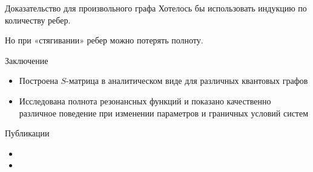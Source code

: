 \documentclass{beamer}
\begin{document}
\begin{frame}{Доказательство для произвольного графа}
Хотелось бы использовать индукцию по количеству ребер.

Но при «стягивании» ребер можно потерять полноту. %
\end{frame}


\begin{frame}{Заключение}
\begin{itemize}
\item Построена $S$-матрица в аналитическом виде для различных квантовых графов
\item Исследована полнота резонансных функций и показано качественно различное поведение при изменении параметров и граничных условий систем
\end{itemize}
\end{frame}


\begin{frame}{Публикации}
\begin{itemize}
\item {}
\item {}
\end{itemize}
\end{frame}
\end{document}
